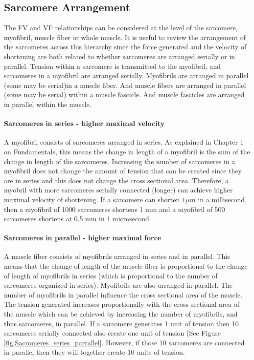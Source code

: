 \subsection{Sarcomere Arrangement}

The FV and VF relationships can be considered at the level of the sarcomere, myofibril, muscle fiber or whole muscle. It is useful to review the arrangement of the sarcomeres across this hierarchy since the force generated and the velocity of shortening are both related to whether sarcomeres are arranged serially or in parallel. Tension within a sarcomere is transmitted to the myofibril, and sarcomeres in a myofibril are arranged serially.  Myofibrils are arranged in parallel (some may be serial)in a muscle fiber. And muscle fibers are arranged in parallel (some may be serial) within a muscle fascicle. And muscle fascicles are arranged in parallel within the muscle.

\paragraph{Sarcomeres in series - higher maximal velocity} 

A myofibril consists of sarcomeres arranged in series. As explained in Chapter 1 on Fundamentals, this means the change in length of a myofibril is the sum of  the change in length of the sarcomeres. Increasing the number of sarcomeres in a myofibril does not change the amount of tension that can be created since they are in series and this does not change the cross sectional area. Therefore, a myobril with more sarcomeres serially connected (longer) can achieve higher maximal velocity of shortening. If a sarcomere can shorten $1 \mu m$ in a millisecond, then a myofibril of 1000 sarcomeres shortens 1 mm and a myofibril of 500 sarcomeres shortens at 0.5 mm in 1 microsecond.


\paragraph{Sarcomeres in parallel - higher maximal force}
A muscle fiber consists of myofibrils arranged in series and in parallel. This means that the change of length of the muscle fiber is proportional to the change of length of myofibrils in series (which is proportional to the number of sarcomeres organized in series). Myofibrils are also arranged in parallel. The number of myofibrils in parallel influence the cross sectional area of the muscle. The tension generated increases proportionally with the cross sectional area of the muscle which can be achieved by increasing the number of myofibrils, and thus sarcomeres, in parallel. If a sarcomere generates 1 unit of tension then 10 sarcomeres serially connected also create one unit of tension (See Figure \ref{fig:Sacromeres_series_parrallel}. However, if those 10 sarcomeres are connected in parallel then they will together create 10 units of tension.

